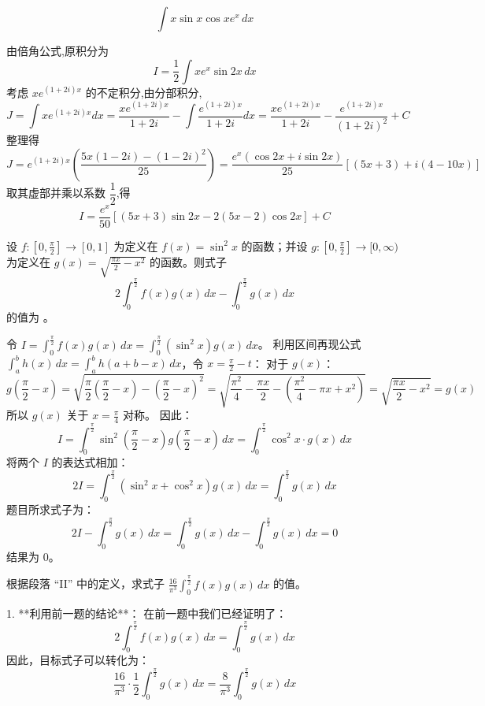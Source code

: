 \begin{questions}
    \question
    \[ 
    \int x \sin x \cos x e^x \,dx 
    \]
    \begin{solution}
        由倍角公式,原积分为
        \[ 
        I = \frac{1}{2} \int x e^x \sin 2x \,dx 
        \]
        考虑 $ xe^{(1+2i)x} $ 的不定积分,由分部积分,
        \[ 
        J=\int x e^{(1+2i)x} dx = \frac{x e^{(1+2i)x}}{1+2i} - \int \frac{e^{(1+2i)x}}{1+2i} dx = \frac{x e^{(1+2i)x}}{1+2i} - \frac{e^{(1+2i)x}}{(1+2i)^2} + C
        \]
        整理得
        \[ 
        J = e^{(1+2i)x} \left( \frac{5x(1-2i) - (1-2i)^2}{25} \right) = \frac{e^x (\cos 2x + i \sin 2x)}{25} [ (5x+3) + i(4-10x) ] 
        \]
        取其虚部并乘以系数 $\dfrac{1}{2}$,得
        \[ 
        I = \frac{e^x}{50} [ (5x+3) \sin 2x - 2(5x-2) \cos 2x ] + C 
        \]
    \end{solution}

    \question 设 $f : [0, \frac{\pi}{2}] \to [0, 1]$ 为定义在 $f(x) = \sin^2 x$ 的函数；并设 $g : [0, \frac{\pi}{2}] \to [0, \infty)$ 为定义在 $g(x) = \sqrt{\frac{\pi x}{2} - x^2}$ 的函数。则式子
\[
2 \int_0^{\frac{\pi}{2}} f(x)g(x) \,dx - \int_0^{\frac{\pi}{2}} g(x) \,dx
\]
的值为 \underline{\hspace{2cm}}。

\begin{solution}
令 $I = \int_0^{\frac{\pi}{2}} f(x)g(x) \,dx = \int_0^{\frac{\pi}{2}} (\sin^2 x) g(x) \,dx$。
利用区间再现公式 $\int_a^b h(x) \,dx = \int_a^b h(a+b-x) \,dx$，令 $x = \frac{\pi}{2} - t$：
对于 $g(x)$：
\[
g\left( \frac{\pi}{2} - x \right) = \sqrt{\frac{\pi}{2}\left( \frac{\pi}{2} - x \right) - \left( \frac{\pi}{2} - x \right)^2} = \sqrt{\frac{\pi^2}{4} - \frac{\pi x}{2} - \left( \frac{\pi^2}{4} - \pi x + x^2 \right)} = \sqrt{\frac{\pi x}{2} - x^2} = g(x)
\]
所以 $g(x)$ 关于 $x = \frac{\pi}{4}$ 对称。
因此：
\[
I = \int_0^{\frac{\pi}{2}} \sin^2 \left( \frac{\pi}{2} - x \right) g\left( \frac{\pi}{2} - x \right) \,dx = \int_0^{\frac{\pi}{2}} \cos^2 x \cdot g(x) \,dx
\]
将两个 $I$ 的表达式相加：
\[
2I = \int_0^{\frac{\pi}{2}} (\sin^2 x + \cos^2 x) g(x) \,dx = \int_0^{\frac{\pi}{2}} g(x) \,dx
\]
题目所求式子为：
\[
2I - \int_0^{\frac{\pi}{2}} g(x) \,dx = \int_0^{\frac{\pi}{2}} g(x) \,dx - \int_0^{\frac{\pi}{2}} g(x) \,dx = 0
\]
结果为 0。
\end{solution}

\question 根据段落 “II” 中的定义，求式子 $\frac{16}{\pi^3} \int_0^{\frac{\pi}{2}} f(x)g(x) \,dx$ 的值。

\begin{solution}
1. **利用前一题的结论**：
在前一题中我们已经证明了：
\[
2 \int_0^{\frac{\pi}{2}} f(x)g(x) \,dx = \int_0^{\frac{\pi}{2}} g(x) \,dx
\]
因此，目标式子可以转化为：
\[
\frac{16}{\pi^3} \cdot \frac{1}{2} \int_0^{\frac{\pi}{2}} g(x) \,dx = \frac{8}{\pi^3} \int_0^{\frac{\pi}{2}} g(x) \,dx
\]


\end{solution}
\end{questions}
